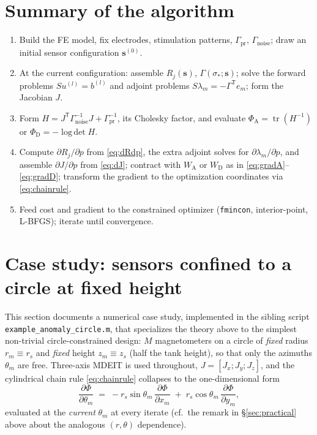 \documentclass[11pt,a4paper]{article}
\newcommand{\tr}{\operatorname{tr}}
\newcommand{\logdet}{\operatorname{log\,det}}
\newcommand{\T}{\mathsf{T}}
\newcommand{\Gnoise}{\Gamma_{\mathrm{noise}}}
\newcommand{\Gprior}{\Gamma_{\mathrm{pr}}}
\newcommand{\code}[1]{\texttt{#1}}
\begin{document}
\section{Summary of the algorithm}

\begin{enumerate}
  \item Build the FE model, fix electrodes, stimulation patterns, $\Gprior$, $\Gnoise$; draw an
        initial sensor configuration $\bm{s}^{(0)}$.
  \item At the current configuration: assemble $R_j(\bm{s})$, $\Gamma(\sigma_*; \bm{s})$; solve
        the forward problems $S u^{(l)} = b^{(l)}$ and adjoint problems
        $S \lambda_m = -\Gamma^\T e_m$; form the Jacobian $J$.
  \item Form $H = J^\T \Gnoise^{-1} J + \Gprior^{-1}$, its Cholesky factor, and evaluate
        $\Phi_{\mathrm{A}} = \tr(H^{-1})$ or $\Phi_{\mathrm{D}} = -\logdet H$.
  \item Compute $\partial R_j / \partial p$ from \eqref{eq:dRdp}, the extra adjoint solves for
        $\partial \lambda_m / \partial p$, and assemble $\partial J / \partial p$ from
        \eqref{eq:dJ}; contract with $W_{\mathrm{A}}$ or $W_{\mathrm{D}}$ as in
        \eqref{eq:gradA}--\eqref{eq:gradD}; transform the gradient to the optimization
        coordinates via \eqref{eq:chainrule}.
  \item Feed cost and gradient to the constrained optimizer (\code{fmincon}, interior-point,
        L-BFGS); iterate until convergence.
\end{enumerate}

\section{Case study: sensors confined to a circle at fixed height}
\label{sec:case-study}

This section documents a numerical case study, implemented in the sibling script
\code{example\_anomaly\_circle.m}, that specializes the theory above to the simplest
non-trivial circle-constrained design: $M$ magnetometers on a circle of \emph{fixed} radius
$r_m \equiv r_s$ and \emph{fixed} height $z_m \equiv z_s$ (half the tank height), so that only the
azimuths $\theta_m$ are free. Three-axis MDEIT is used throughout, $J = [J_x;J_y;J_z]$, and the
cylindrical chain rule \eqref{eq:chainrule} collapses to the one-dimensional form
\begin{equation}
\label{eq:chainrule1d}
  \frac{\partial \Phi}{\partial \theta_m}
  \;=\;
  -r_s \sin\theta_m\, \frac{\partial \Phi}{\partial x_m}
  \;+\;
  r_s \cos\theta_m\, \frac{\partial \Phi}{\partial y_m} ,
\end{equation}
evaluated at the \emph{current} $\theta_m$ at every iterate (cf.\ the remark in
\S\ref{sec:practical} above about the analogous $(r,\theta)$ dependence).
\end{document}
